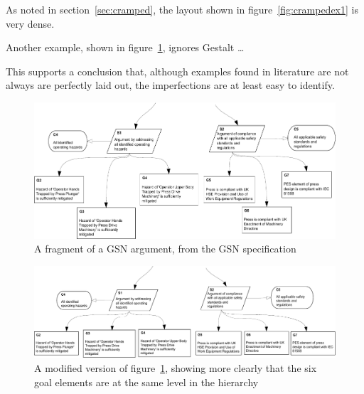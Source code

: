 \begin{itemize*}
\item As noted in section~\ref{sec:cramped}, the layout shown in figure~\ref{fig:crampedex1} is very dense.
\item Another example, shown in figure~\ref{fig:unalignedsiblings}, ignores  Gestalt \ldots
\end{itemize*}

This supports a conclusion that, although examples found in literature are not always are perfectly laid out, the imperfections are at least easy to identify.

\begin{figure}
    \includegraphics[width=\textwidth]{graphics/unaligned_siblings.pdf}
    \caption{A fragment of a GSN argument,
            from the GSN specification \citep[figure~42, section~2.3.6.5, pp.~34]{gsnstandard}}
    \label{fig:unalignedsiblings}
\end{figure}

\begin{figure}
    \includegraphics[width=\textwidth]{graphics/aligned_siblings.pdf}
    \caption{A modified version of figure~\ref{fig:unalignedsiblings},
            showing more clearly that the six goal elements are at the same level in the hierarchy}
    \label{fig:alignedsiblings}
\end{figure}





